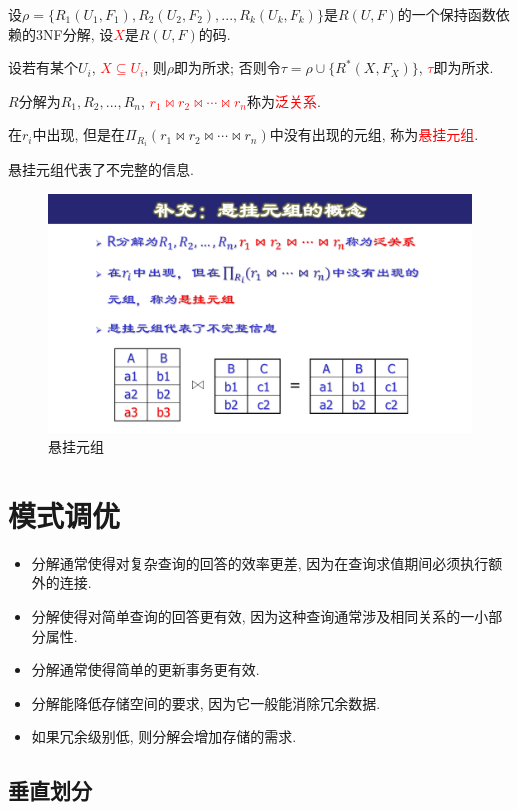 设$\rho = \{ R_1(U_1,F_1), R_2(U_2,F_2), ..., R_k(U_k,F_k) \}$是$R(U,F)$的一个保持函数依赖的3NF分解, 设\textcolor{red}{$X$}是$R(U,F)$的码.

设若有某个$U_i$, \textcolor{red}{$X \subseteq U_i$}, 则$\rho$即为所求;
否则令$\tau = \rho \cup \{ R^*(X,F_X) \}$, \textcolor{red}{$\tau$}即为所求.


\begin{definition}[悬挂元组]
  $R$分解为$R_1,R_2,...,R_n$, \textcolor{red}{$r_1\bowtie r_2\bowtie \cdots \bowtie r_n$}称为\textcolor{red}{泛关系}.

  在$r_i$中出现, 但是在$\Pi_{R_i}(r_1\bowtie r_2\bowtie \cdots \bowtie r_n)$中没有出现的元组, 称为\textcolor{red}{悬挂元组}.
\end{definition}

悬挂元组代表了不完整的信息.
\begin{figure}[H]
    \centering
    \includegraphics[width=.6\textwidth]{./figure/悬挂元组.pdf}
    \caption{悬挂元组}
\end{figure}

\section{模式调优}

\begin{itemize}
  \item 分解通常使得对复杂查询的回答的效率更差, 因为在查询求值期间必须执行额外的连接.
  \item 分解使得对简单查询的回答更有效, 因为这种查询通常涉及相同关系的一小部分属性.
  \item 分解通常使得简单的更新事务更有效.
  \item 分解能降低存储空间的要求, 因为它一般能消除冗余数据.
  \item 如果冗余级别低, 则分解会增加存储的需求.
\end{itemize}

\subsection{垂直划分}

